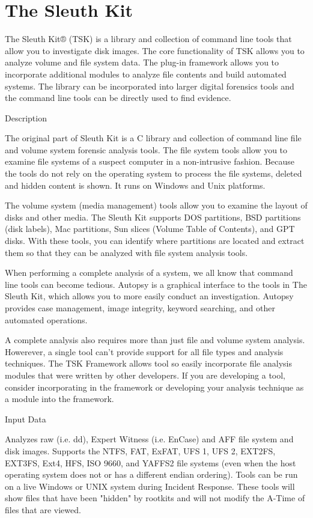 \section{The Sleuth Kit}

The Sleuth Kit® (TSK) is a library and collection of command line tools that allow
you to investigate disk images. The core functionality of TSK allows you to analyze
volume and file system data. The plug-in framework allows you to incorporate
additional modules to analyze file contents and build automated systems. The
library can be incorporated into larger digital forensics tools and the command
line tools can be directly used to find evidence.

Description

The original part of Sleuth Kit is a C library and collection of command line
file and volume system forensic analysis tools. The file system tools allow you
to examine file systems of a suspect computer in a non-intrusive fashion. Because
the tools do not rely on the operating system to process the file systems, deleted
and hidden content is shown. It runs on Windows and Unix platforms.

The volume system (media management) tools allow you to examine the layout of disks
and other media. The Sleuth Kit supports DOS partitions, BSD partitions 
(disk labels), Mac partitions, Sun slices (Volume Table of Contents), and 
GPT disks. With these tools, you can identify where partitions are located 
and extract them so that they can be analyzed with file system analysis tools.

When performing a complete analysis of a system, we all know that command line 
tools can become tedious. Autopsy is a graphical interface to the tools in The 
Sleuth Kit, which allows you to more easily conduct an investigation. Autopsy 
provides case management, image integrity, keyword searching, and other automated
operations.

A complete analysis also requires more than just file and volume system analysis.
Howerever, a single tool can't provide support for all file types and analysis 
techniques. The TSK Framework allows tool so easily incorporate file analysis
modules that were written by other developers. If you are developing a tool,
consider incorporating in the framework or developing your analysis technique
as a module into the framework.

Input Data

Analyzes raw (i.e. dd), Expert Witness (i.e. EnCase) and AFF file system and disk
images.
Supports the NTFS, FAT, ExFAT, UFS 1, UFS 2, EXT2FS, EXT3FS, Ext4, HFS, ISO 9660,
and YAFFS2 file systems (even when the host operating system does not or has a
different endian ordering).
Tools can be run on a live Windows or UNIX system during Incident Response. 
These tools will show files that have been "hidden" by rootkits and will not 
modify the A-Time of files that are viewed.

